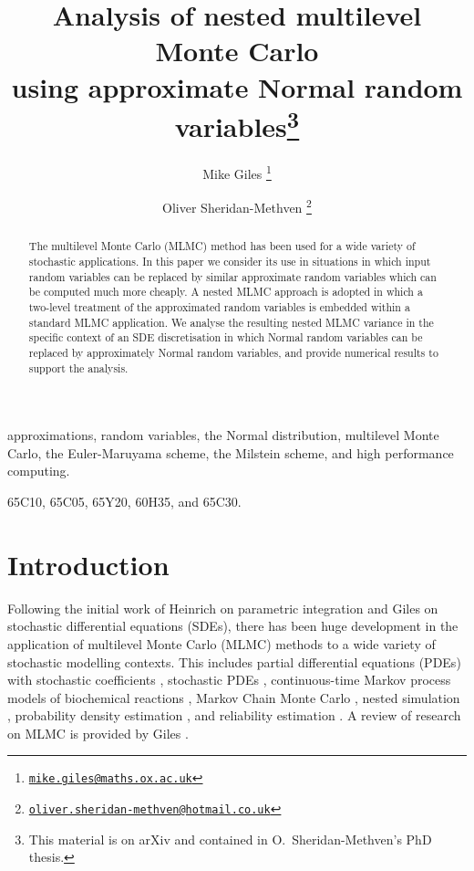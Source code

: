 \documentclass[review]{siamart190516}
\begin{document}
\title{Analysis of nested multilevel Monte Carlo \\ using approximate Normal random variables\footnote{{This material is on arXiv and contained in O.\ Sheridan-Methven's PhD thesis.}}}

\author{
Mike Giles%
\thanks{\href{mailto:mike.giles@maths.ox.ac.uk}%
{\texttt{mike.giles@maths.ox.ac.uk}}}
\and 
Oliver Sheridan-Methven%
\thanks{\href{mailto:oliver.sheridan-methven@hotmail.co.uk}%
{\texttt{oliver.sheridan-methven@hotmail.co.uk}}}
}

\maketitle

\begin{abstract}
The multilevel Monte Carlo (MLMC) method has been used for a wide variety
of stochastic applications.  In this paper we consider its use in situations
in which input random variables can be replaced by similar approximate random
variables which can be computed much more cheaply.  A nested MLMC approach is
adopted in which a two-level treatment of the approximated random variables
is embedded within a standard MLMC application. We analyse the resulting
nested MLMC variance in the specific context of an SDE discretisation in
which Normal random variables can be replaced by approximately Normal
random variables, and provide numerical results to support the analysis.
\end{abstract}

\begin{keywords}
approximations, random variables, the Normal distribution, multilevel Monte Carlo, the Euler-Maruyama scheme, the Milstein scheme, and high performance computing.
\end{keywords}

\begin{AMS}
65C10, 65C05, 65Y20, 60H35, and 65C30.
\end{AMS}


\section{Introduction}

Following the initial work of Heinrich \cite{heinrich98} on parametric
integration and Giles \cite{giles08} on stochastic differential equations
(SDEs), there has been huge development in the application of multilevel
Monte Carlo (MLMC) methods to a wide variety of stochastic modelling
contexts. This includes partial differential equations (PDEs) with
stochastic coefficients \cite{cgst11,bsz11}, stochastic PDEs \cite{gr12},
continuous-time Markov process models of biochemical reactions
\cite{ah12,ahs14},
Markov Chain Monte Carlo \cite{hss13,sst17},
nested simulation \cite{bhr15,gg19},
probability density estimation \cite{gnr15,bc16},
and reliability estimation \cite{up15,ehm16}.
A review of research on MLMC is provided by Giles \cite{giles15}.
\end{document}
